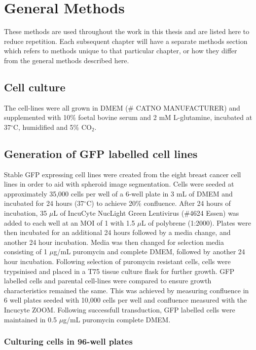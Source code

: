 \documentclass[a4paper,11pt,twoside,openright]{scrbook}
\begin{document}
\chapter{General Methods} \label{chapter:generalMethods}

These methods are used throughout the work in this thesis and are listed here to reduce repetition.
Each subsequent chapter will have a separate methods section which refers to methods unique to that particular chapter, or how they differ from the general methods described here.


\section{Cell culture}
The cell-lines were all grown in DMEM (\# CATNO MANUFACTURER) and supplemented with 10\% foetal bovine serum and 2 mM L-glutamine, incubated at 37$^\circ$C, humidified and 5\% CO$_2$.


\section{Generation of GFP labelled cell lines}
Stable GFP expressing cell lines were created from the eight breast cancer cell lines in order to aid with spheroid image segmentation.
Cells were seeded at approximately 35,000 cells per well of a 6-well plate in 3 mL of DMEM and incubated for 24 hours (37$^\circ$C) to achieve 20\% confluence.
After 24 hours of incubation, 35 $\mu$L of IncuCyte NucLight Green Lentivirus (\#4624 Essen) was added to each well at an  MOI of 1 with 1.5 $\mu$L of polybrene (1:2000).
Plates were then incubated for an additional 24 hours followed by a media change, and another 24 hour incubation.
Media was then changed for selection media consisting of 1 $\mu$g/mL puromycin and complete DMEM, followed by another 24 hour incubation.
Following selection of puromycin resistant cells, cells were trypsinised and placed in a T75 tissue culture flask for further growth.
GFP labelled cells and parental cell-lines were compared to ensure growth characteristics remained the same.
This was achieved by measuring confluence in 6 well plates seeded with 10,000 cells per well and confluence measured with the Incucyte ZOOM.
Following successfull transduction, GFP labelled cells were maintained in 0.5 $\mu$g/mL puromycin complete DMEM.


\subsection{Culturing cells in 96-well plates}
\end{document}
